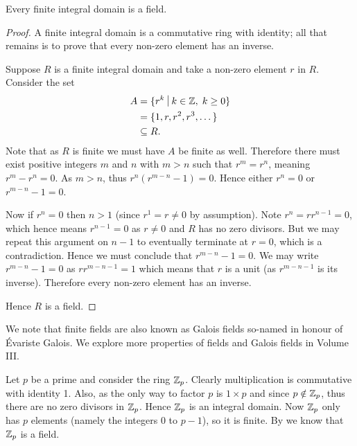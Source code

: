 \begin{proposition}\label{prop-finite-integral-domain-is-field}
    Every finite integral domain is a field.
\end{proposition}
\begin{proof}
    A finite integral domain is a commutative ring with identity; all that remains is to prove that every non-zero element has an inverse.

    Suppose $R$ is a finite integral domain and take a non-zero element $r$ in $R$. Consider the set
    \begin{align*}
        A &= \{r^k \vert k \in \Z,\;k\geq 0\}\\
        &= \{1, r, r^2, r^3, \dots\}\\
        &\subseteq R.
    \end{align*}
    Note that as $R$ is finite we must have $A$ be finite as well. Therefore there must exist positive integers $m$ and $n$ with $m > n$ such that $r^m = r^n$, meaning $r^m - r^n = 0$. As $m > n$, thus $r^n\left(r^{m-n}-1\right) = 0$. Hence either $r^n = 0$ or $r^{m-n} - 1 = 0$.

    Now if $r^n = 0$ then $n > 1$ (since $r^1 = r \neq 0$ by assumption). Note $r^n = rr^{n-1} = 0$, which hence means $r^{n-1} = 0$ as $r \neq 0$ and $R$ has no zero divisors. But we may repeat this argument on $n - 1$ to eventually terminate at $r = 0$, which is a contradiction. Hence we must conclude that $r^{m-n} - 1 = 0$. We may write $r^{m-n}-1 = 0$ as $rr^{m-n-1} = 1$ which means that $r$ is a unit (as $r^{m-n-1}$ is its inverse). Therefore every non-zero element has an inverse.

    Hence $R$ is a field.
\end{proof}

\begin{remark}
    We note that finite fields are also known as Galois fields so-named in honour of \'{E}variste Galois. We explore more properties of fields and Galois fields in Volume III.
\end{remark}

\begin{example}
    Let $p$ be a prime and consider the ring $\mathbb{Z}_{p}$. Clearly multiplication is commutative with identity 1. Also, as the only way to factor $p$ is $1 \times p$ and since $p \notin \mathbb{Z}_{p}$, thus there are no zero divisors in $\mathbb{Z}_{p}$. Hence $\mathbb{Z}_{p}$ is an integral domain. Now $\mathbb{Z}_{p}$ only has $p$ elements (namely the integers 0 to $p - 1$), so it is finite. By  we know that $\mathbb{Z}_{p}$ is a field.
\end{example}

